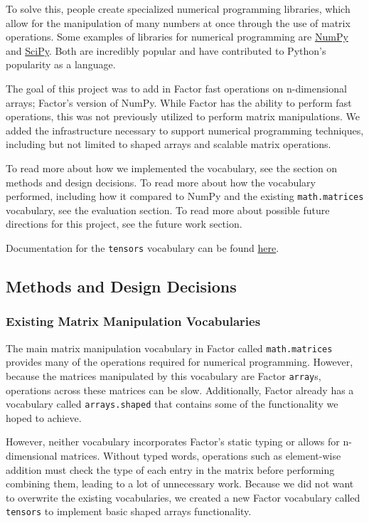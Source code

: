 \documentclass[
]{article}
\begin{document}
To solve this, people create specialized numerical programming
libraries, which allow for the manipulation of many numbers at once
through the use of matrix operations. Some examples of libraries for
numerical programming are \href{https://numpy.org/}{NumPy} and
\href{https://www.scipy.org/}{SciPy}. Both are incredibly popular and
have contributed to Python's popularity as a language.

The goal of this project was to add in Factor fast operations on
n-dimensional arrays; Factor's version of NumPy. While Factor has the
ability to perform fast operations, this was not previously utilized to
perform matrix manipulations. We added the infrastructure necessary to
support numerical programming techniques, including but not limited to
shaped arrays and scalable matrix operations.

To read more about how we implemented the vocabulary, see the section on
methods and design decisions. To read more about how the vocabulary
performed, including how it compared to NumPy and the existing
\texttt{math.matrices} vocabulary, see the evaluation section. To read
more about possible future directions for this project, see the future
work section.

Documentation for the \texttt{tensors} vocabulary can be found
\href{https://docs.factorcode.org/content/article-tensors.html}{here}.

\hypertarget{methods-and-design-decisions}{%
\subsection{Methods and Design
Decisions}\label{methods-and-design-decisions}}

\hypertarget{existing-matrix-manipulation-vocabularies}{%
\subsubsection{Existing Matrix Manipulation
Vocabularies}\label{existing-matrix-manipulation-vocabularies}}

The main matrix manipulation vocabulary in Factor called
\texttt{math.matrices} provides many of the operations required for
numerical programming. However, because the matrices manipulated by this
vocabulary are Factor \texttt{array}s, operations across these matrices
can be slow. Additionally, Factor already has a vocabulary called
\texttt{arrays.shaped} that contains some of the functionality we hoped
to achieve.

However, neither vocabulary incorporates Factor's static typing or
allows for n-dimensional matrices. Without typed words, operations such
as element-wise addition must check the type of each entry in the matrix
before performing combining them, leading to a lot of unnecessary work.
Because we did not want to overwrite the existing vocabularies, we
created a new Factor vocabulary called \texttt{tensors} to implement
basic shaped arrays functionality.
\end{document}
